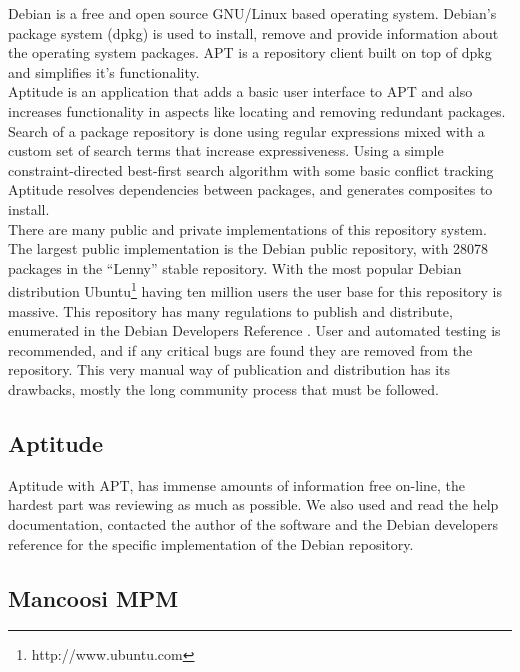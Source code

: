 Debian is a free and open source GNU/Linux based operating system. 
Debian's package system (dpkg) is used to install, remove and provide information about the operating system packages. 
APT is a repository client built on top of dpkg and simplifies it's functionality.\\
Aptitude is an application that adds a basic user interface to APT and also increases functionality in aspects like 
locating and removing redundant packages. 
Search of a package repository is done using regular expressions mixed with a
custom set of search terms that increase expressiveness. Using a simple
constraint-directed best-first search algorithm with some basic conflict
tracking Aptitude resolves dependencies between packages, and generates
composites to install.\\ 
There are many public and private implementations of this repository system. 
The largest public implementation is the Debian public repository, with 28078 packages in the ``Lenny'' stable repository.
With the most popular Debian distribution Ubuntu\footnote{http://www.ubuntu.com} having ten million users \cite{vance_software_2009} the user base for this repository is massive.
This repository has many regulations to publish and distribute, enumerated in the Debian Developers Reference \cite{andreas_barth_debian_2008}. 
User and automated testing is recommended, and if any critical bugs are found they are removed from the repository. 
This very manual way of publication and
distribution has its drawbacks, mostly the long community process that must be followed.\\

\subsection{Aptitude}
Aptitude with APT, has immense amounts of information free on-line, the hardest part was reviewing as much as possible.
We also used and read the help documentation, contacted the author of the software \cite{burrows_modelling_2005} and
the Debian developers reference for the specific implementation of the Debian repository.

\subsection{Mancoosi MPM}

